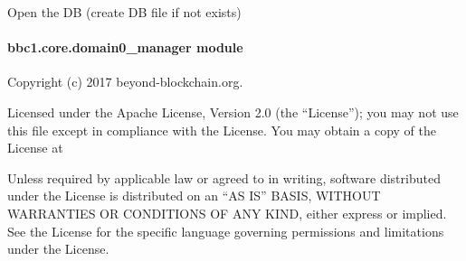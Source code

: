 \documentclass[letterpaper,10pt,english]{sphinxmanual}
\begin{document}
\begin{fulllineitems}
\begin{fulllineitems}
\begin{quote}
\begin{description}
\begin{itemize}
\end{itemize}

\end{description}\end{quote}

\end{fulllineitems}


\begin{fulllineitems}
\label{\detokenize{bbc1.core.data_handler:bbc1.core.data_handler.SqliteAdaptor.open_db}}
Open the DB (create DB file if not exists)

\end{fulllineitems}


\end{fulllineitems}



\paragraph{bbc1.core.domain0\_manager module}
\label{\detokenize{bbc1.core.domain0_manager:module-bbc1.core.domain0_manager}}\label{\detokenize{bbc1.core.domain0_manager:bbc1-core-domain0-manager-module}}\label{\detokenize{bbc1.core.domain0_manager::doc}}
Copyright (c) 2017 beyond-blockchain.org.

Licensed under the Apache License, Version 2.0 (the “License”);
you may not use this file except in compliance with the License.
You may obtain a copy of the License at
\begin{quote}

\end{quote}

Unless required by applicable law or agreed to in writing, software
distributed under the License is distributed on an “AS IS” BASIS,
WITHOUT WARRANTIES OR CONDITIONS OF ANY KIND, either express or implied.
See the License for the specific language governing permissions and
limitations under the License.
\end{document}
